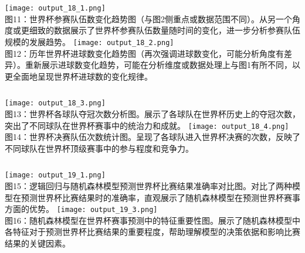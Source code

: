 \documentclass{beamer}
\begin{document}
	\begin{frame}
		\begin{columns}
			\centering
			\texttt{[image: output\_18\_1.png]} \\
			\small 图11：世界杯参赛队伍数变化趋势图（与图2侧重点或数据范围不同）。从另一个角度或更细致的数据展示了世界杯参赛队伍数量随时间的变化，进一步分析参赛队伍规模的发展趋势。
			\centering
			\texttt{[image: output\_18\_2.png]} \\
			\small 图12：历年世界杯进球数变化趋势图（再次强调进球数变化，可能分析角度有差异）。重新展示进球数变化趋势，可能在分析维度或数据处理上与图1有所不同，以更全面地呈现世界杯进球数的变化规律。
		\end{columns}
	\end{frame}
	
	\begin{frame}
		\begin{columns}
			\column{0.5\textwidth}
			\centering
			\texttt{[image: output\_18\_3.png]} \\
			\small 图13：世界杯各球队夺冠次数分析图。展示了各球队在世界杯历史上的夺冠次数，突出了不同球队在世界杯赛事中的统治力和成就。
			\column{0.5\textwidth}
			\centering
			\texttt{[image: output\_18\_4.png]} \\
			\small 图14：世界杯决赛队伍次数统计图。呈现了各球队进入世界杯决赛的次数，反映了不同球队在世界杯顶级赛事中的参与程度和竞争力。
		\end{columns}
	\end{frame}
	
	\begin{frame}
		\begin{columns}
			\column{0.5\textwidth}
			\centering
			\texttt{[image: output\_19\_1.png]} \\
			\small 图15：逻辑回归与随机森林模型预测世界杯比赛结果准确率对比图。对比了两种模型在预测世界杯比赛结果时的准确率，直观展示了随机森林模型在预测世界杯赛事方面的优势。
			\column{0.5\textwidth}
			\centering
			\texttt{[image: output\_19\_3.png]} \\
			\small 图16：随机森林模型在世界杯赛事预测中的特征重要性图。展示了随机森林模型中各特征对于预测世界杯比赛结果的重要程度，帮助理解模型的决策依据和影响比赛结果的关键因素。
		\end{columns}
	\end{frame}
	
\end{document}
